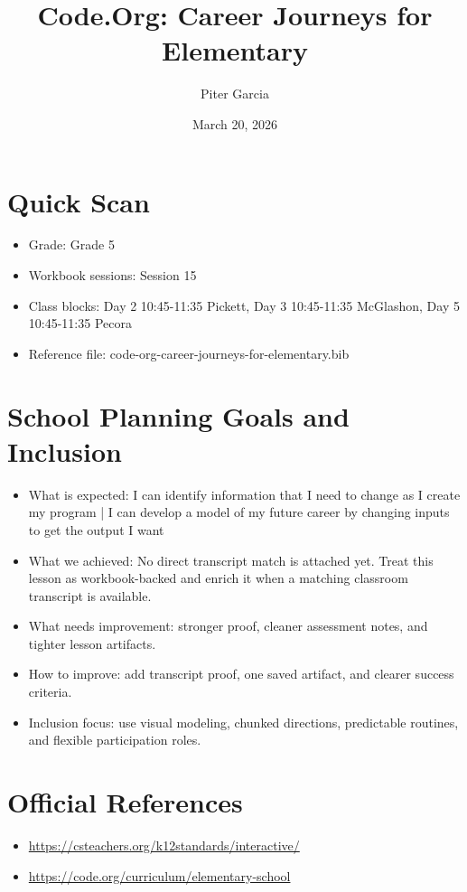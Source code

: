\documentclass[11pt]{article}
\title{Code.Org: Career Journeys for Elementary}
\author{Piter Garcia}
\date{March 20, 2026}
\begin{document}
    \maketitle
    \section*{Quick Scan}
    \begin{itemize}[leftmargin=*]
    \item Grade: Grade 5
    \item Workbook sessions: Session 15
    \item Class blocks: Day 2 10:45-11:35 Pickett, Day 3 10:45-11:35 McGlashon, Day 5 10:45-11:35 Pecora
    \item Reference file: code-org-career-journeys-for-elementary.bib
    \end{itemize}
    \section*{School Planning Goals and Inclusion}
    \begin{itemize}[leftmargin=*]
    \item What is expected: I can identify information that I need to change as I create my program | I can develop a model of my future career by changing inputs to get the output I want
    \item What we achieved: No direct transcript match is attached yet. Treat this lesson as workbook-backed and enrich it when a matching classroom transcript is available.
    \item What needs improvement: stronger proof, cleaner assessment notes, and tighter lesson artifacts.
    \item How to improve: add transcript proof, one saved artifact, and clearer success criteria.
    \item Inclusion focus: use visual modeling, chunked directions, predictable routines, and flexible participation roles.
    \end{itemize}
    \section*{Official References}
    \begin{itemize}[leftmargin=*]
    \item \url{https://csteachers.org/k12standards/interactive/}
\item \url{https://code.org/curriculum/elementary-school}

    \end{itemize}
    
\end{document}
